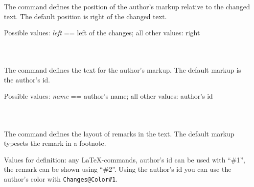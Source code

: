 \subsubsection{}
\DescribeMacro{\setauthormarkupposition}

The command  defines the position of the author's markup relative to the changed text.
The default position is right of the changed text.

Possible values: \emph{left} == left of the changes; all other values: right

\begin{chusage}
		\>\\
	\usageexample
		\>
\end{chusage}



\subsubsection{}
\DescribeMacro{\setauthormarkuptext}

The command  defines the text for the author's markup.
The default markup is the author's id.

Possible values: \emph{name} == author's name; all other values: author's id

\begin{chusage}
		\>\\
	\usageexample
		\>
\end{chusage}



\subsubsection{}
\DescribeMacro{\setremarkmarkup}

The command  defines the layout of remarks in the text.
The default markup typesets the remark in a footnote.

Values for definition: any \LaTeX-commands, author's id can be used with ``\#1'', the remark can be shown using ``\#2''.
Using the author's id you can use the author's color with \texttt{Changes@Color\#1}.

